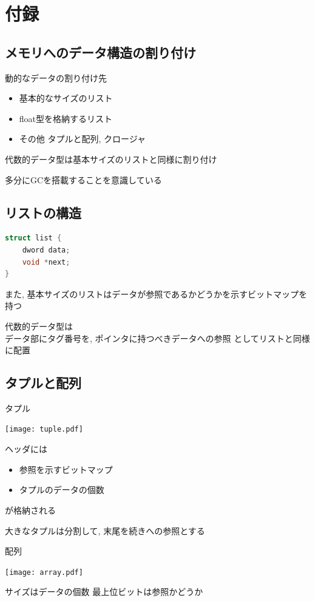 \documentclass[papersize,30pt,slide]{jsarticle}
\begin{document}
\section{付録}
\subsection{メモリへのデータ構造の割り付け}
動的なデータの割り付け先
\begin{itemize}
\item 基本的なサイズのリスト
\item float型を格納するリスト
\item その他 タプルと配列, クロージャ
\end{itemize}
代数的データ型は基本サイズのリストと同様に割り付け

多分にGCを搭載することを意識している

\newpage
\subsection{リストの構造}
\begin{lstlisting}[language=C]
struct list {
    dword data;
    void *next;
}
\end{lstlisting}
また, 基本サイズのリストはデータが参照であるかどうかを示すビットマップを持つ

\vspace{1em}

代数的データ型は \\
データ部にタグ番号を, ポインタに持つべきデータへの参照
としてリストと同様に配置

\newpage
\subsection{タプルと配列}
タプル

\texttt{[image: tuple.pdf]}

ヘッダには
\begin{itemize}
\item 参照を示すビットマップ
\item タプルのデータの個数
\end{itemize}
が格納される

大きなタプルは分割して, 末尾を続きへの参照とする

\newpage

配列

\texttt{[image: array.pdf]}

サイズはデータの個数 最上位ビットは参照かどうか
\end{document}
